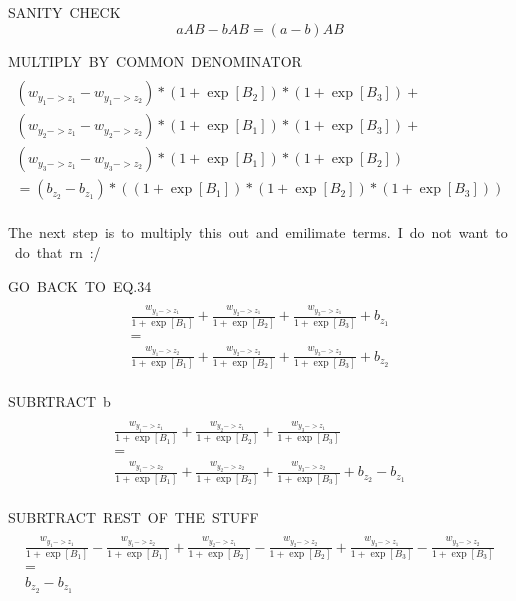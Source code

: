 \documentclass{article}
\begin{document}
\hbox{SANITY CHECK}  
\begin{equation}
    aAB - bAB = (a-b)AB
\end{equation}

\hbox{MULTIPLY BY COMMON DENOMINATOR}
\begin{multline}
    \\
    (w_{y_1->z_1} - w_{y_1->z_2}) * (1+\exp[B_2]) * (1+\exp[B_3]) +\\
    (w_{y_2->z_1} - w_{y_2->z_2}) * (1+\exp[B_1]) * (1+\exp[B_3]) +\\
    (w_{y_3->z_1} - w_{y_3->z_2}) * (1+\exp[B_1]) * (1+\exp[B_2]) 
    \\= (b_{z_2} - b_{z_1}) * ((1+\exp[B_1]) * (1+\exp[B_2]) * (1+\exp[B_3]))
    \\
\end{multline}

\hbox{The next step is to multiply this out and emilimate terms. I do not want to do that rn :/}




\newpage
\hbox{GO BACK TO EQ.34}
\begin{multline}
    \\
        \frac{w_{y_1->z_1}}{1+\exp[B_1]}
        + \frac{w_{y_2->z_1}}{1+\exp[B_2]}
        + \frac{w_{y_3->z_1}}{1+\exp[B_3]}
        + b_{z_1}
        \\=\\
        \frac{w_{y_1->z_2}}{1+\exp[B_1]}
        + \frac{w_{y_2->z_2}}{1+\exp[B_2]}
        + \frac{w_{y_3->z_2}}{1+\exp[B_3]}
        + b_{z_2}
    \\
\end{multline}

\hbox{SUBRTRACT b}
\begin{multline}
    \\
        \frac{w_{y_1->z_1}}{1+\exp[B_1]}
        + \frac{w_{y_2->z_1}}{1+\exp[B_2]}
        + \frac{w_{y_3->z_1}}{1+\exp[B_3]}
        \\=\\
        \frac{w_{y_1->z_2}}{1+\exp[B_1]}
        + \frac{w_{y_2->z_2}}{1+\exp[B_2]}
        + \frac{w_{y_3->z_2}}{1+\exp[B_3]}
        + b_{z_2} - b_{z_1}
    \\
\end{multline}

\hbox{SUBRTRACT REST OF THE STUFF}
\begin{multline}
    \\
        \frac{w_{y_1->z_1}}{1+\exp[B_1]} -
        \frac{w_{y_1->z_2}}{1+\exp[B_1]} + 
        \frac{w_{y_2->z_1}}{1+\exp[B_2]} - 
        \frac{w_{y_2->z_2}}{1+\exp[B_2]} + 
        \frac{w_{y_3->z_1}}{1+\exp[B_3]} -
        \frac{w_{y_3->z_2}}{1+\exp[B_3]}
        \\=\\
         b_{z_2} - b_{z_1}
    \\
\end{multline}
\end{document}
